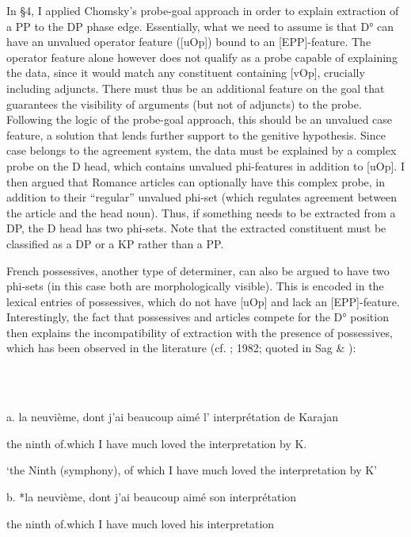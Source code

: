 \documentclass[output=paper]{langsci/langscibook}
\begin{document}
  In §4, I applied Chomsky’s probe-goal approach in order to explain extraction of a PP to the DP phase edge. Essentially, what we need to assume is that D° can have an unvalued operator feature ([uOp]) bound to an [EPP]-feature. The operator feature alone however does not qualify as a probe capable of explaining the data, since it would match any constituent containing [vOp], crucially including adjuncts. There must thus be an additional feature on the goal that guarantees the visibility of arguments (but not of adjuncts) to the probe. Following the logic of the probe-goal approach, this should be an unvalued case feature, a solution that lends further support to the genitive hypothesis. Since case belongs to the agreement system, the data must be explained by a complex probe on the D head, which contains unvalued phi-features in addition to [uOp]. I then argued that Romance articles can optionally have this complex probe, in addition to their “regular” unvalued phi-set (which regulates agreement between the article and the head noun). Thus, if something needs to be extracted from a DP, the D head has two phi-sets. Note that the extracted constituent must be classified as a DP or a KP rather than a PP.

  French possessives, another type of determiner, can also be argued to have two phi-sets (in this case both are morphologically visible). This is encoded in the lexical entries of possessives, which do not have [uOp] and lack an [EPP]-feature. Interestingly, the fact that possessives and articles compete for the D° position then explains the incompatibility of extraction with the presence of possessives, which has been observed in the literature (cf. \citealt{Milner1978}; 1982; quoted in Sag \& \citealt{Godard1994}):

\ea%
    \label{ex:key:32}
    \gll\\
        \\
    \glt
    \z

          a.  la  neuvième,  dont    j’ai  beaucoup  aimé  l’  interprétation    de  Karajan

    the  ninth    of.which  I have  much    loved  the  interpretation    by  K.

    ‘the Ninth (symphony), of which I have much loved the interpretation by K’

  b.  *la  neuvième,  dont    j’ai  beaucoup  aimé  son  interprétation

    the  ninth    of.which  I have  much    loved  his  interpretation
\end{document}
